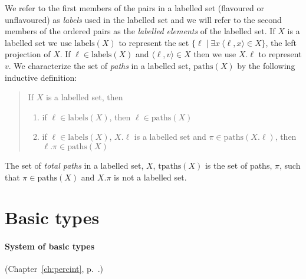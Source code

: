 We refer to the first members of the pairs in a
labelled set (flavoured or unflavoured) as \textit{labels} used in the labelled set and we will refer to
the second members of the ordered pairs as the \textit{labelled
  elements} of the labelled set.  If $X$ is a labelled set we use
$\mathrm{labels}(X)$ to represent the set $\{\ell\mid\exists 
x\ \langle\ell,x\rangle\in X\}$, the left projection of $X$.  If
$\ell\in\mathrm{labels}(X)$ and $\langle\ell,v\rangle\in X$ then we
use $X.\ell$ to represent $v$.  We characterize the set of
\textit{paths} in a labelled set, $\mathrm{paths}(X)$ by the following
inductive definition:
\begin{quote}
If $X$ is a labelled set, then
\begin{enumerate} 
 
\item if $\ell\in\mathrm{labels}(X)$, then $\ell\in\mathrm{paths}(X)$ 
 
\item if $\ell\in\mathrm{labels}(X)$, $X.\ell$ is a labelled set and
  $\pi\in\mathrm{paths}(X.\ell)$, then $\ell.\pi\in\mathrm{paths}(X)$ 
 
\end{enumerate} 
\end{quote}

The set of \textit{total paths} in a labelled set, $X$,
$\mathrm{tpaths}(X)$ is the set of paths, $\pi$, such that
\mbox{$\pi\in\mathrm{paths}(X)$} and $X.\pi$ is not a labelled set.
 
  



\section{Basic types}
\label{sec:basic}

\paragraph{System of basic types} (Chapter~\ref{ch:percint}, p.~\pageref{ex:def-basic-types}.)

